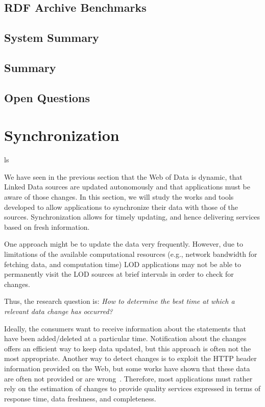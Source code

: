 \documentclass[sw]{iosart2x}
\begin{document}
\subsection{RDF Archive Benchmarks}\label{Benchmarks}
\subsection{System Summary}\label{System3}
\subsection{Summary}\label{Summary3}
\subsection{Open Questions}\label{Open3}


\section{Synchronization}\label{Index}ls

We have seen in the previous section that the Web of Data is dynamic, that Linked Data sources are updated autonomously and that applications must be aware of those changes. In this section, we will study the works and tools developed to allow applications to synchronize their data with those of the sources. Synchronization allows for timely updating, and hence delivering services based on fresh information.

One approach might be to update the data very frequently. However, due to limitations of the available computational resources (e.g., network bandwidth for fetching data, and computation time) LOD applications may not be able to permanently visit the LOD sources at brief intervals in order to check for changes.

Thus, the research question is: \textit{How to determine the best time at which a relevant data change has occurred?}

Ideally, the consumers want to receive information about the statements that have been added/deleted at a particular time. Notification about the changes offers an efficient way to keep data updated, but this approach is often not the most appropriate. Another way to detect changes is to exploit the HTTP header information provided on the Web, but some works have shown that these data are often not provided or are wrong~\cite{UmbrichHHPD10, DividinoKG14, Kjernsmo15, NeumaierU16}. Therefore, most applications must rather rely on the estimation of changes to provide quality services expressed in terms of response time, data freshness, and completeness.
\end{document}
